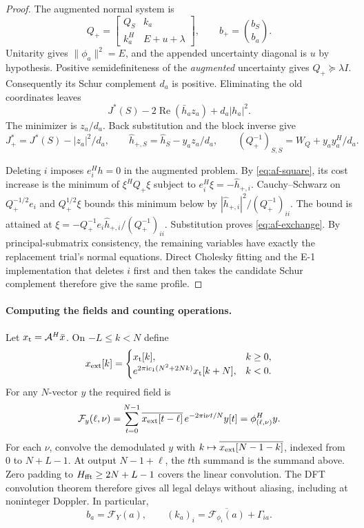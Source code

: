 \begin{proof}
The augmented normal system is
\[
 Q_+=\begin{bmatrix}Q_S&k_a\\k_a^H&E+u+\lambda\end{bmatrix},
 \qquad b_+=\binom{b_S}{b_a}.
\]
Unitarity gives $\|\phi_a\|^2=E$, and the appended uncertainty
diagonal is $u$ by hypothesis. Positive semidefiniteness of the
\emph{augmented} uncertainty gives $Q_+\succeq\lambda I$.
Consequently its Schur complement $d_a$ is positive. Eliminating
the old coordinates leaves
\[
 J^*(S)-2\operatorname{Re}(\bar h_a z_a)+d_a|h_a|^2 .
\]
The minimizer is $z_a/d_a$. Back substitution and the block inverse
give
\[
 J_+^*=J^*(S)-|z_a|^2/d_a,\qquad
 \hat h_{+,S}=\hat h_S-y_a z_a/d_a,\qquad
 (Q_+^{-1})_{S,S}=W_Q+y_ay_a^H/d_a .
\]

Deleting $i$ imposes $e_i^Hh=0$ in the augmented problem. By
\eqref{eq:af-square}, its cost increase is the minimum of
$\xi^HQ_+\xi$ subject to $e_i^H\xi=-\hat h_{+,i}$.
Cauchy--Schwarz on $Q_+^{-1/2}e_i$ and $Q_+^{1/2}\xi$ bounds this
minimum below by $|\hat h_{+,i}|^2/(Q_+^{-1})_{ii}$. The bound is
attained at
$\xi=-Q_+^{-1}e_i\hat h_{+,i}/(Q_+^{-1})_{ii}$. Substitution proves
\eqref{eq:af-exchange}. By principal-submatrix consistency, the
remaining variables have exactly the replacement trial's normal
equations. Direct Cholesky fitting and the E-1 implementation that
deletes $i$ first and then takes the candidate Schur complement
therefore give the same profile.
\end{proof}

\paragraph{Computing the fields and counting operations.}
Let $x_{\rm t}=\mathcal A^H\bar x$. On $-L\le k<N$ define
\[
 x_{\rm ext}[k]=
 \begin{cases}
 x_{\rm t}[k],&k\ge0,\\
 e^{2\pi\mathrm{i}c_1(N^2+2Nk)}x_{\rm t}[k+N],&k<0 .
 \end{cases}
\]
For any $N$-vector $y$ the required field is
\[
 \mathcal F_y(\ell,\nu)=
 \sum_{t=0}^{N-1}\overline{x_{\rm ext}[t-\ell]}\,
       e^{-2\pi\mathrm{i}\nu t/N}y[t]=\phi_{(\ell,\nu)}^Hy .
\]
For each $\nu$, convolve the demodulated $y$ with
$k\mapsto\overline{x_{\rm ext}[N-1-k]}$, indexed from $0$ to $N+L-1$.
At output $N-1+\ell$, the $t$th summand is the summand above. Zero
padding to $H_{\rm fft}\ge2N+L-1$ covers the linear convolution.
The DFT convolution theorem therefore gives all legal delays without
aliasing, including at noninteger Doppler. In particular,
\[
 b_a=\mathcal F_Y(a),\qquad
 (k_a)_i=\overline{\mathcal F_{\phi_i}(a)}+\Gamma_{ia}.
\]

